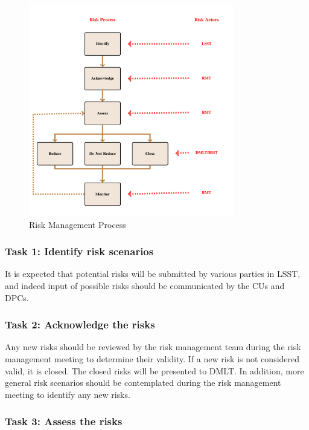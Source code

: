\begin{figure}[H]
\begin{center}
\includegraphics[width=0.8\textwidth]{images/RiskProcess}
\end{center}
\caption{Risk Management Process}
\label{fig:riskprocess}
\end{figure}

\subsubsection*{Task 1: Identify risk scenarios}

It is expected that potential risks will be submitted by various parties in LSST, and indeed input of possible risks should be communicated by the CUs and DPCs.

\subsubsection*{Task 2: Acknowledge the risks}
Any new risks should be reviewed by the risk management team during the risk management meeting to determine their validity. If a new risk is not considered valid, it is closed. The closed risks will be presented to DMLT.
In addition, more general risk scenarios should be contemplated during the risk management meeting to identify any new risks.

\subsubsection*{Task 3: Assess the risks}

